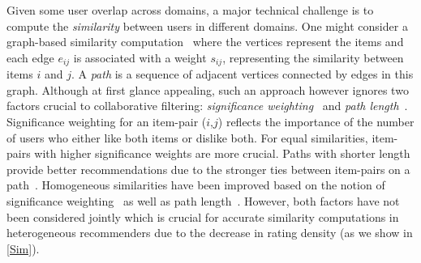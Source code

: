 
 Given some user overlap across domains, a major technical challenge is to compute the \emph{similarity} between users in different domains. One might consider a graph-based similarity computation~\cite{cremonesi2011cross} where the vertices represent the items and each edge $e_{ij}$ is associated with a weight $s_{ij}$, representing the similarity between items $i$ and $j$. A \emph{path} is a sequence of adjacent vertices connected by edges in this graph. Although at first glance appealing, such an approach however ignores two factors crucial to collaborative filtering: \emph{significance weighting}~\cite{herlocker1999algorithmic} and \emph{path length}~\cite{ramakrishnan2001privacy}. Significance weighting for an item-pair ($i$,$j$) reflects the importance of the number of users who either like both items or dislike both. For equal similarities, item-pairs with higher significance weights are more crucial. Paths with shorter length provide better recommendations due to the stronger ties between item-pairs on a path~\cite{ramakrishnan2001privacy}. Homogeneous similarities have been improved based on the notion of significance weighting~\cite{herlocker1999algorithmic} as well as path length~\cite{ramakrishnan2001privacy,sun2011pathsim}. However, both factors have not been considered jointly which is crucial for accurate similarity computations in heterogeneous recommenders due to the decrease in rating density (as we show in \autoref{Sim}).

